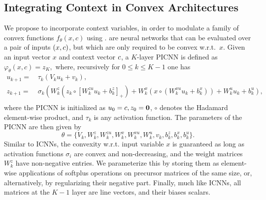 \subsection{Integrating Context in Convex Architectures}
We propose to incorporate context variables, in order to modulate a family of convex functions $f_{\theta}(x, c)$
using .  are neural networks that can be evaluated over a pair of inputs $(x,c)$, but which are only required to be convex w.r.t.~$x$. Given an input vector $x$ and context vector $c$, a $K$-layer PICNN is defined as $\varphi_\theta(x, c) = z_{K},$ where, recursively for $0\leq k \leq K-1$ one has
\begin{equation} \label{eq:picnn}
\begin{aligned} 
u_{k+1} =&\, \tau_{k}\left(V_{k} u_{k}+v_{k}\right), \\
z_{k+1} =&\, \sigma_{k}\left(W_{k}^{z}\left(z_{k} \circ\left[W_{k}^{z u} u_{k}+b_{k}^{z}\right]_+\right)+\right.
\left.W_{k}^{x}\left(x \circ(W_{k}^{x u} u_{k}+b_{k}^{x})\right)+W_{k}^{u} u_{k}+b_{k}^u\right), \\
\end{aligned}
\end{equation}
where the PICNN is initialized as $u_{0}=c, z_0 = \mathbf{0}$, $\circ$ denotes the Hadamard element-wise product, and $\tau_k$ is any activation function. The parameters of the PICNN are then given by
$$\theta = \{ V_{k}, W_{k}^{z}, W_{k}^{z u}, W_{k}^{x}, W_{k}^{x u} , W_{k}^{u}, v_{k}, b_{k}^{z}, b_{k}^{x}, b_{k}^u \}.$$ 
Similar to ICNNs, the convexity w.r.t. input variable $x$ is guaranteed as long as activation functions $\sigma_i$ are convex and non-decreasing, and the weight matrices $W_{k}^{z}$ have non-negative entries. We parameterize this by storing them as element-wise applications of softplus operations on precursor matrices of the same size, or, alternatively, by regularizing their negative part. Finally, much like ICNNs, all matrices at the $K-1$ layer are line vectors, and their biases scalars.

